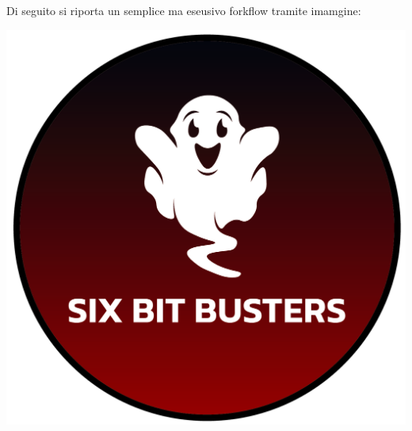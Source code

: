         Di seguito si riporta un semplice ma eseusivo forkflow tramite imamgine:
        \begin{center}
            \includegraphics{template/images/logo-circle.png}
        \end{center}

